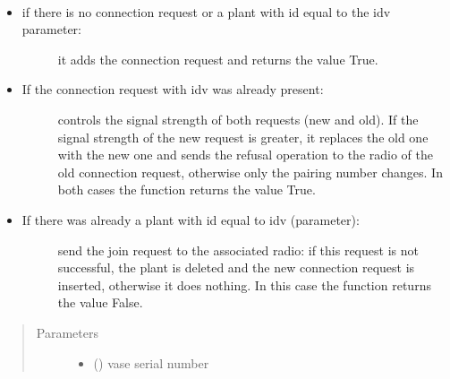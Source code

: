 \documentclass[letterpaper,10pt,english]{sphinxmanual}
\begin{document}
\begin{fulllineitems}
\label{\detokenize{index:controller.utility.add_conn_req}}~\begin{itemize}
\item {} \begin{description}
\item[{if there is no connection request or a plant with id equal to the idv parameter:}] \leavevmode
it adds the connection request and returns the value True.

\end{description}

\item {} \begin{description}
\item[{If the connection request with idv was already present:}] \leavevmode
controls the signal strength of both requests (new and old).
If the signal strength of the new request is greater,
it replaces the old one with the new one and sends the refusal
operation to the radio of the old connection request,
otherwise only the pairing number changes.
In both cases the function returns the value True.

\end{description}

\item {} \begin{description}
\item[{If there was already a plant with id equal to idv (parameter):}] \leavevmode
send the join request to the associated radio:
if this request is not successful, the plant is deleted
and the new connection request is inserted, otherwise it does nothing.
In this case the function returns the value False.

\end{description}

\end{itemize}
\begin{quote}\begin{description}
\item[{Parameters}] \leavevmode\begin{itemize}
\item {} 
 () \textendash{} vase serial number


\end{itemize}
\end{description}
\end{quote}
\end{fulllineitems}
\end{document}
